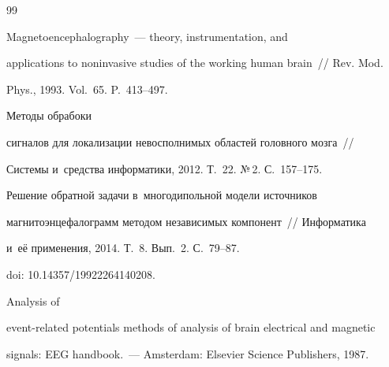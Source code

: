 {\small\frenchspacing

{%


\begin{thebibliography}{99}



Magnetoencephalography~--- theory, instrumentation, and 

applications to noninvasive studies of the working human brain~/\!\!/ Rev. Mod. 

Phys., 1993. Vol.~65. P.~413--497.





Методы обрабоки

сигналов для локализации невосполнимых областей головного мозга~/\!\!/ 

Системы и~средства информатики, 2012. Т.~22. №\,2. С.~157--175.








 Решение обратной задачи в~многодипольной модели источников 

магнитоэнцефалограмм методом независимых компонент~/\!\!/  Информатика 

и~её применения, 2014. Т.~8. Вып.~2. С.~79--87.

doi: 10.14357/19922264140208.








 Analysis of 

event-related potentials methods of analysis of brain electrical and magnetic 

signals: EEG handbook.~--- Amsterdam: Elsevier Science Publishers, 1987.


\end{thebibliography}}}
